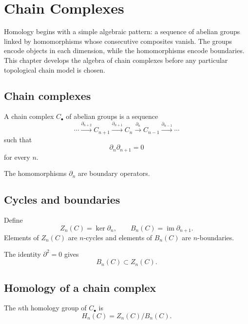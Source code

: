 ﻿\chapter{Chain Complexes}
\label{ch:viii16-chain-complexes}

Homology begins with a simple algebraic pattern: a sequence of abelian groups
linked by homomorphisms whose consecutive composites vanish.  The groups encode
objects in each dimension, while the homomorphisms encode boundaries.  This
chapter develops the algebra of chain complexes before any particular
topological chain model is chosen.

\section{Chain complexes}

\begin{definition}
\label{def:viii16-chain-complex}
A chain complex \(C_\bullet\) of abelian groups is a sequence
\[
\cdots
\xrightarrow{\partial_{n+2}}
C_{n+1}
\xrightarrow{\partial_{n+1}}
C_n
\xrightarrow{\partial_n}
C_{n-1}
\xrightarrow{\partial_{n-1}}
\cdots
\]
such that
\[
\partial_n\partial_{n+1}=0
\]
for every \(n\).
\end{definition}

The homomorphisms \(\partial_n\) are boundary operators.

\section{Cycles and boundaries}

\begin{definition}
\label{def:viii16-cycles-boundaries}
Define
\[
Z_n(C)=\ker\partial_n,
\qquad
B_n(C)=\operatorname{im}\partial_{n+1}.
\]
Elements of \(Z_n(C)\) are \(n\)-cycles and elements of \(B_n(C)\) are
\(n\)-boundaries.
\end{definition}

The identity \(\partial^2=0\) gives
\[
B_n(C)\subset Z_n(C).
\]

\section{Homology of a chain complex}

\begin{definition}
\label{def:viii16-homology}
The \(n\)th homology group of \(C_\bullet\) is
\[
H_n(C)=Z_n(C)/B_n(C).
\]
\end{definition}

